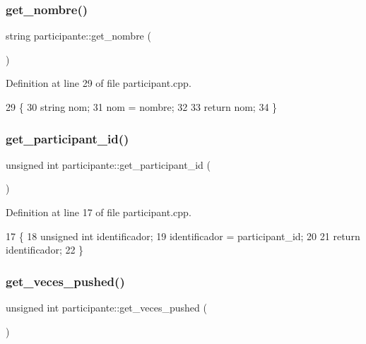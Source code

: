 \subsubsection{\texorpdfstring{get\+\_\+nombre()}{get\_nombre()}}
{\footnotesize\ttfamily string participante\+::get\+\_\+nombre (\begin{DoxyParamCaption}{ }\end{DoxyParamCaption})}



Definition at line 29 of file participant.\+cpp.


\begin{DoxyCode}
29                                \{
30     \textcolor{keywordtype}{string} nom;
31     nom = nombre;
32 
33     \textcolor{keywordflow}{return} nom;
34 \}
\end{DoxyCode}
\mbox{\label{classparticipante_a7bf312844c7814bcaaf6b20466a16283}} 
\subsubsection{\texorpdfstring{get\+\_\+participant\+\_\+id()}{get\_participant\_id()}}
{\footnotesize\ttfamily unsigned int participante\+::get\+\_\+participant\+\_\+id (\begin{DoxyParamCaption}{ }\end{DoxyParamCaption})}



Definition at line 17 of file participant.\+cpp.


\begin{DoxyCode}
17                                              \{
18     \textcolor{keywordtype}{unsigned} \textcolor{keywordtype}{int} identificador;
19     identificador = participant\_id;
20 
21     \textcolor{keywordflow}{return} identificador;
22 \}
\end{DoxyCode}
\mbox{\label{classparticipante_a7141f603db73fc7efa9788e41aa8dd66}} 
\subsubsection{\texorpdfstring{get\+\_\+veces\+\_\+pushed()}{get\_veces\_pushed()}}
{\footnotesize\ttfamily unsigned int participante\+::get\+\_\+veces\+\_\+pushed (\begin{DoxyParamCaption}{ }\end{DoxyParamCaption})}




